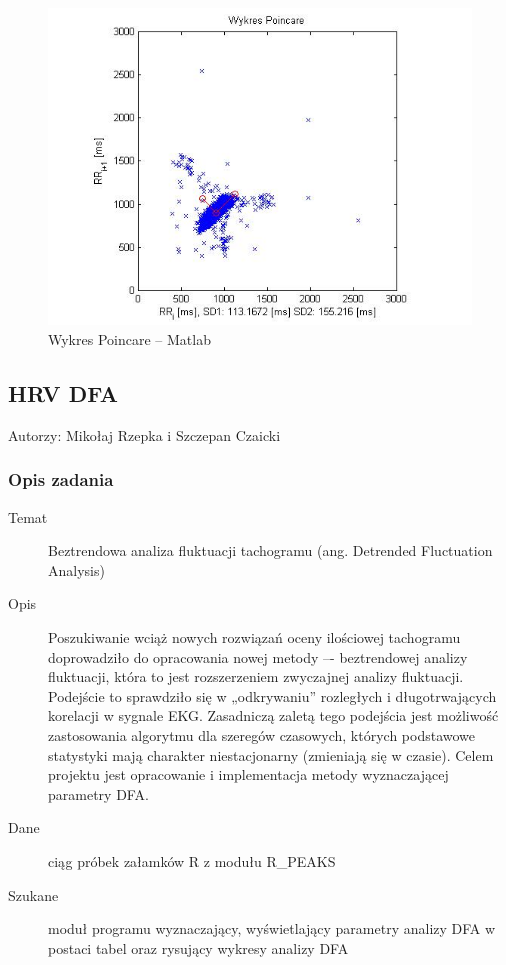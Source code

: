 \documentclass[a4paper, 11pt]{article}
\begin{document}
\begin{center}
%
\begin{figure}
\begin{centering}
\includegraphics[scale=0.7]{include/hrv2_3}
\par\end{centering}

\caption{Wykres Poincare -- Matlab}
\label{fig:hrv2_3}
\end{figure}

\par\end{center}

\subsection{HRV DFA}
\label{sec:dfa}
Autorzy: Mikołaj Rzepka i Szczepan Czaicki

\subsubsection{Opis zadania}
\label{sec:dfa:desc}

\begin{description}
\item[Temat] Beztrendowa analiza fluktuacji tachogramu (ang. Detrended Fluctuation Analysis)
\item[Opis] Poszukiwanie wciąż nowych rozwiązań oceny ilościowej tachogramu doprowadziło do
opracowania nowej metody –- beztrendowej analizy fluktuacji, która to jest rozszerzeniem
zwyczajnej analizy fluktuacji. Podejście to sprawdziło się w „odkrywaniu” rozległych
i długotrwających korelacji w sygnale EKG. Zasadniczą zaletą tego podejścia jest możliwość
zastosowania algorytmu dla szeregów czasowych, których podstawowe statystyki mają
charakter niestacjonarny (zmieniają się w czasie). Celem projektu jest opracowanie
i implementacja metody wyznaczającej parametry DFA.
\item[Dane] ciąg próbek załamków R z modułu R\_PEAKS
\item[Szukane] moduł programu wyznaczający, wyświetlający parametry analizy DFA w postaci
tabel oraz rysujący wykresy analizy DFA
\end{description}
\end{document}
